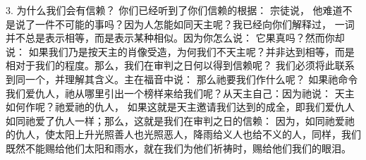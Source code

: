 3.  为什么我们会有信赖？ 你们已经听到了你们信赖的根据： 宗徒说， 他难道不是说了一件不可能的事吗？因为人怎能如同天主呢？我已经向你们解释过， 一词并不总是表示相等，而是表示某种相似。因为你怎么说： 它果真吗？然而你却说： 如果我们乃是按天主的肖像受造，为何我们不天主呢？并非达到相等，而是相对于我们的程度。那么，我们在审判之日何以得到信赖呢？ 我们必须将此联系到同一个，并理解其含义。主在福音中说： 那么祂要我们作什么呢？ 如果祂命令我们爱仇人，祂从哪里引出一个榜样来给我们呢？从天主自己：因为祂说： 天主如何作呢？祂爱祂的仇人， 如果这就是天主邀请我们达到的成全，即我们爱仇人如同祂爱了仇人一样；那么，这就是我们在审判之日的信赖： 因为，如同祂爱祂的仇人，使太阳上升光照善人也光照恶人，降雨给义人也给不义的人，同样，我们既然不能赐给他们太阳和雨水，就在我们为他们祈祷时，赐给他们我们的眼泪。\par

